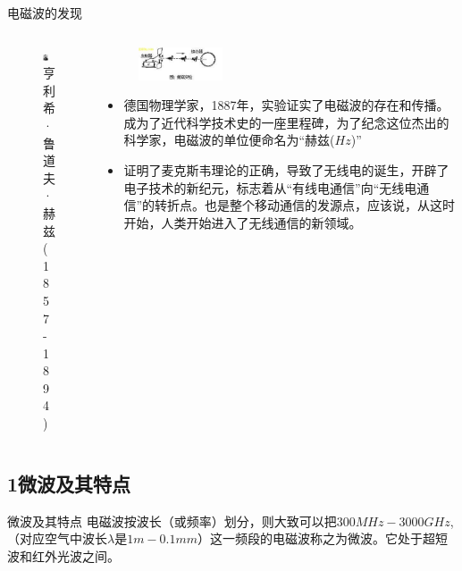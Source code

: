 \documentclass{ctexbeamer}
\begin{document}
\begin{frame}{电磁波的发现}
  \begin{columns}
    \begin{column}{0.35\linewidth}
      \begin{figure}
        \includegraphics[width=3cm]{hertz.jpg}
        \caption{亨利希·鲁道夫·赫兹(1857 - 1894)}
      \end{figure}
    \end{column}
    \begin{column}{0.65\linewidth}
      \begin{figure}
        \flushright
        \includegraphics[width=2.5cm]{hertzexperiment.jpg}
      \end{figure}
      \begin{itemize}
        \item 德国物理学家，1887年，实验证实了电磁波的存在和传播。成为了近代科学技术史的一座里程碑，为了纪念这位杰出的科学家，电磁波的单位便命名为“赫兹($Hz$)”
        \item 证明了麦克斯韦理论的正确，导致了无线电的诞生，开辟了电子技术的新纪元，标志着从“有线电通信”向“无线电通信”的转折点。也是整个移动通信的发源点，应该说，从这时开始，人类开始进入了无线通信的新领域。
      \end{itemize}
    \end{column}
  \end{columns}
\end{frame}

\subsection{1\quad 微波及其特点}
\begin{frame}{微波及其特点}
  电磁波按波长（或频率）划分，则大致可以把$300MHz - 3000GHz$,（对应空气中波长$\lambda$是$1m - 0.1mm$）这一频段的电磁波称之为微波。它处于超短波和红外光波之间。
\end{frame}
\end{document}
